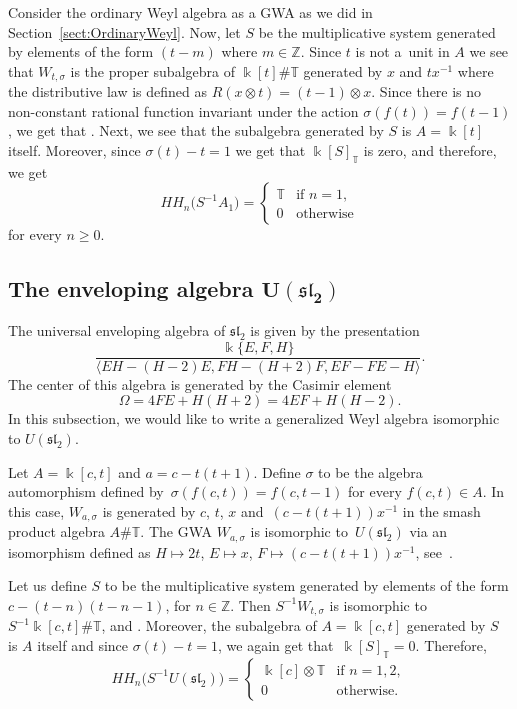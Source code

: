 \documentclass[pdftex]{sigma}
\newcommand{\G}[1]{\mathfrak{#1}}
\newcommand{\B}[1]{\mathbb{#1}}
\newcommand{\CH}{{\rm CH}}
\renewcommand{\geq}{\geqslant}
\numberwithin{equation}{section}
\begin{document}
Consider the ordinary Weyl algebra as a GWA as we did in Section~\ref{sect:OrdinaryWeyl}. Now,
let $S$ be the multiplicative system generated by elements of the form $(t-m)$ where $m\in\B{Z}$.
Since $t$ is not a~unit in $A$ we see that $W_{t,\sigma}$ is the proper subalgebra of
$\Bbbk[t]\# \B{T}$ generated by $x$ and $tx^{-1}$ where the distributive law is defined as
$R(x\otimes t) = (t-1)\otimes x$. Since there is no non-constant rational function invariant under
the action $\sigma(f(t))=f(t-1)$, we get that \smash{$\CH_*\bigl(S^{-1}\Bbbk[t]\bigr)^{\B{T}} = \CH_*(\Bbbk)$}. Next,
we see that the subalgebra generated by $S$ is $A=\Bbbk[t]$ itself. Moreover, since $\sigma(t)-t=1$
we get that $\Bbbk[S]_{\B{T}}$ is zero, and therefore, we get
\[
 HH_n\bigl(S^{-1}A_1\bigr) =
 \begin{cases}
 \B{T} & \text{if } n=1,\\
 0 & \text{otherwise}
 \end{cases}
\]
for every $n\geq 0$.

\subsection[The enveloping algebra U(G sl\_2)]{The enveloping algebra $\boldsymbol{U(\G{sl}_2)}$}\label{sect:Usl2}

The universal enveloping algebra of $\G{sl}_2$ is given by the presentation
\[ \frac{\Bbbk\{E,F,H\}}{\langle EH-(H-2)E, FH - (H+2)F, EF-FE-H \rangle}. \] The center
of this algebra is generated by the Casimir element
\[ \Omega = 4 FE + H(H + 2) = 4EF + H(H - 2). \] In this subsection, we would like to write
a generalized Weyl algebra isomorphic to $U(\G{sl}_2)$.

Let $A=\Bbbk[c,t]$ and $a=c-t(t+1)$. Define $\sigma$ to be the algebra automorphism
defined by~${\sigma(f(c,t)) = f(c,t-1)}$ for every $f(c,t)\in A$. In this case,
$W_{a,\sigma}$ is generated by $c$, $t$, $x$ and~${(c-t(t+1))x^{-1}}$ in the smash product
algebra $A\# \B{T}$. The GWA $W_{a,\sigma}$ is isomorphic to~$U(\G{sl}_2)$ via an
isomorphism defined as
$H\mapsto 2t$, $ E\mapsto x$, $ F\mapsto (c-t(t+1))x^{-1}$,
see~\cite[Example~2.2]{FarinatiSolotarAlvarez:GeneralizedWeyAlgebras}.

Let us define $S$ to be the multiplicative system generated by elements of the form
$c-(t-n)(t-n-1)$, for $ n\in\B{Z}$.
Then $S^{-1}W_{t,\sigma}$ is isomorphic to $S^{-1}\Bbbk[c,t]\# \B{T}$, and
\smash{$\CH_*\bigl(S^{-1}A\bigr)^{\B{T}}=\CH_*(\Bbbk[c])$}. Moreover, the subalgebra of $A=\Bbbk[c,t]$ generated by
$S$ is $A$ itself and since $\sigma(t)-t = 1$, we again get that~${\Bbbk[S]_{\B{T}}=0}$.
Therefore,
\[
 HH_n\bigl(S^{-1}U(\G{sl}_2)\bigr) =
 \begin{cases}
 \Bbbk[c]\otimes \B{T} & \text{if } n=1,2,\\
 0 & \text{otherwise}.
 \end{cases}
\]
\end{document}
